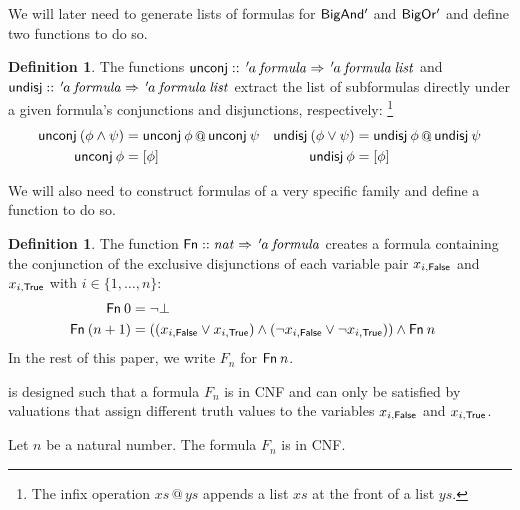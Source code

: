 \documentclass[a4paper,USenglish,cleveref, autoref, thm-restate]{lipics-v2021}
\theoremstyle{definition}
\newtheorem{definitionx}[theorem]{Definition}
\begin{document}
We will later need to generate lists of formulas for $\mathsf{BigAnd'}$ and $\mathsf{BigOr'}$ and define two functions to do so.

\begin{definitionx}
  \label{def_unconj_undisj}
  The functions
  $\mathsf{unconj} \mathrel{::} {\thinspace'}{\kern-.175ex a} \> \mathit{formula} \Rightarrow {\thinspace'}{\kern-.175ex a} \> \mathit{formula} \> \mathit{list}$ and
  $\mathsf{undisj} \mathrel{::} {\thinspace'}{\kern-.175ex a} \> \mathit{formula} \Rightarrow {\thinspace'}{\kern-.175ex a} \> \mathit{formula} \> \mathit{list}$
  extract the list of subformulas directly under a given formula's conjunctions and disjunctions, respectively:%
  \footnote{The infix operation $xs \mathop{@} ys$ appends a list $xs$ at the front of a list $ys$.}
  \begin{align*}
    \mathsf{unconj} \> (\phi \land \psi) =\; & \mathsf{unconj} \> \phi \mathop{@} \mathsf{unconj} \> \psi &
    \mathsf{undisj} \> (\phi \lor \psi) =\; & \mathsf{undisj} \> \phi \mathop{@} \mathsf{undisj} \> \psi \\
    \mathsf{unconj} \> \phi =\; & [\phi] &
    \mathsf{undisj} \> \phi =\; & [\phi]
  \end{align*}
\end{definitionx}

We will also need to construct formulas of a very specific family and define a function to do so.

\begin{definitionx}
  \label{def_Fn}
  The function $\mathsf{Fn} \mathrel{::} \mathit{nat} \Rightarrow {\thinspace'}{\kern-.175ex a} \> \mathit{formula}$ creates a formula containing
  the conjunction of the exclusive disjunctions of each variable pair $x_{i,\mathsf{False}}$ and $x_{i,\mathsf{True}}$ with $i \in \{1,\ldots,n\}$:
  \begin{align*}
    \mathsf{Fn} \> 0 =\; & \neg\bot &  \\
    \mathsf{Fn} \> (n+1) =\; & ((x_{i,\mathsf{False}} \lor x_{i,\mathsf{True}}) \land (\neg x_{i,\mathsf{False}} \lor \neg x_{i,\mathsf{True}})) \land \mathsf{Fn} \> n
  \end{align*}
  In the rest of this paper, we write $F_n$ for $\mathsf{Fn} \> n$.
\end{definitionx}

 is designed such that a formula $F_n$ is in CNF and can only be satisfied by valuations that assign different truth values to the variables $x_{i,\mathsf{False}}$ and $x_{i,\mathsf{True}}$.

\begin{lemma}
  \label{thm_is_cnf_Fn}
  Let $n$ be a natural number.
  The formula $F_n$ is in CNF.
\end{lemma}
\end{document}
